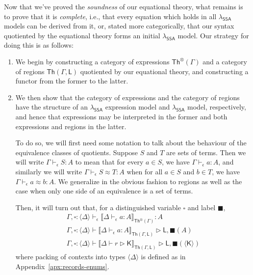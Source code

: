 \documentclass[acmsmall,screen,review]{acmart}
\newcommand{\ms}[1]{\ensuremath{\mathsf{#1}}}
\newcommand{\hasty}[4]{#1 \vdash_{#2} #3: {#4}}
\newcommand{\haslb}[3]{#1 \vdash #2 \rhd #3}
\newcommand{\teqv}{\approx}
\newcommand{\tmeq}[5]{#1 \vdash_{#2} #3 \teqv #4 : {#5}}
\newcommand{\dnt}[1]{\llbracket{#1}\rrbracket}
\newcommand{\invar}{\square}
\newcommand{\outlb}{\blacksquare}
\newcommand{\pckd}[1]{\langle #1 \rangle}
\newcommand{\isotopessa}{\(\lambda_{\ms{SSA}}\)}
\begin{document}
Now that we've proved the \emph{soundness} of our equational theory, what remains is to prove that
it is \emph{complete}, i.e., that every equation which holds in all \isotopessa{} models can be
derived from it, or, stated more categorically, that our syntax quotiented by the equational theory
forms an initial \isotopessa{} model.
%
Our strategy for doing this is as follows:
\begin{enumerate}
  \item We begin by constructing a category of expressions $\ms{Th}^\otimes(\Gamma)$ and a category
  of regions $\ms{Th}(\Gamma, \ms{L})$ quotiented by our equational theory, and constructing a
  functor from the former to the latter.
  \item We then show that the category of expressions and the category of regions have the structure
  of an \isotopessa{} expression model and \isotopessa{} model, respectively, and hence that
  expressions may be interpreted in the former and both expressions and regions in the latter.

  To do so, we will first need some notation to talk about the behaviour of the equivalence classes
  of quotients. Suppose $S$ and $T$ are sets of terms. Then we will write
  $\hasty{\Gamma}{\epsilon}{S}{A}$ to mean that for every $a \in S$, we have
  $\hasty{\Gamma}{\epsilon}{a}{A}$, and similarly we will write $\tmeq{\Gamma}{\epsilon}{S}{T}{A}$
  when for all $a \in S$ and $b \in T$, we have $\tmeq{\Gamma}{\epsilon}{a}{b}{A}$. We generalize in
  the obvious fashion to regions as well as the case when only one side of an equivalence is a set
  of terms.

  Then, it will turn out that, for a distinguished variable $\invar$ and label $\outlb$,
  \begin{equation}
    \begin{gathered}
      \hasty{\Gamma, \invar : \pckd{\Delta}}{\epsilon}
        {\dnt{\hasty{\Delta}{\epsilon}{a}{A}}_{\ms{Th}^\otimes(\Gamma)}}{A}
        \\
      \haslb{\Gamma, \invar : \pckd{\Delta}}
        {\dnt{\hasty{\Delta}{\epsilon}{a}{A}}_{\ms{Th}(\Gamma, \ms{L})}}{\ms{L}, \outlb(A)}
        \\
      \haslb{\Gamma, \invar : \pckd{\Delta}}
        {\dnt{\haslb{\Delta}{r}{\ms{K}}}_{\ms{Th}(\Gamma, \ms{L})}}{\ms{L}, \outlb(\pckd{\ms{K}})}
    \end{gathered}
  \end{equation}
  where packing of contexts into types $\pckd{\Delta}$ is defined as in
  Appendix~\ref{apx:records-enums}.
  

\end{enumerate}
\end{document}
